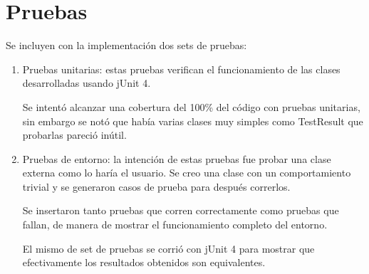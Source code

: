 \documentclass[12pt]{article}
\begin{document}
\section{Pruebas}
Se incluyen con la implementación dos sets de pruebas:

	\begin{enumerate}
	
	\item Pruebas unitarias: estas pruebas verifican el funcionamiento de 
	las clases desarrolladas usando jUnit 4. 
	
	Se intentó alcanzar una cobertura del 100\% del código con pruebas 
	unitarias, sin embargo se notó que había varias clases muy simples como 
	TestResult que probarlas pareció inútil.

	\item Pruebas de entorno: la intención de estas pruebas fue probar una 
	clase externa como lo haría el usuario.
	Se creo una clase con un comportamiento trivial y se generaron casos de
	prueba para después correrlos. 
	
	Se insertaron tanto pruebas que corren correctamente como pruebas que
	fallan, de manera de mostrar el funcionamiento completo del entorno.
	
	El mismo de set de pruebas se corrió con jUnit 4 para mostrar que 
	efectivamente los resultados obtenidos son equivalentes.
	\end{enumerate}
\end{document}
